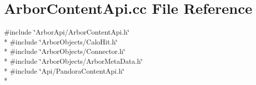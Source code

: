 \section{Arbor\+Content\+Api.\+cc File Reference}
\label{ArborContentApi_8cc}
{\ttfamily \#include \char`\"{}Arbor\+Api/\+Arbor\+Content\+Api.\+h\char`\"{}}\\*
{\ttfamily \#include \char`\"{}Arbor\+Objects/\+Calo\+Hit.\+h\char`\"{}}\\*
{\ttfamily \#include \char`\"{}Arbor\+Objects/\+Connector.\+h\char`\"{}}\\*
{\ttfamily \#include \char`\"{}Arbor\+Objects/\+Arbor\+Meta\+Data.\+h\char`\"{}}\\*
{\ttfamily \#include \char`\"{}Api/\+Pandora\+Content\+Api.\+h\char`\"{}}\\*
